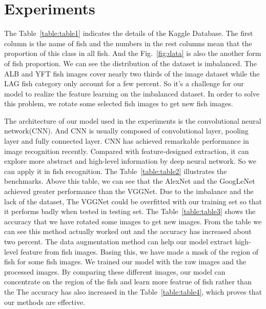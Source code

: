 \documentclass[conference]{IEEEtran}
\begin{document}




\section{Experiments}
The Table~\ref{table:table1} indicates the details of the Kaggle Database. The first column is the name of fish and the numbers in the rest columns mean that the proportion of this class in all fish. And the Fig.~\ref{fig:data} is also the another form of fish proportion. We can see the distribution of the dataset is imbalanced. The ALB and YFT fish images cover nearly two thirds of the image dataset while the LAG fish category only account for a few percent. So it's a challenge for our model to realize the feature learning on the imbalanced dataset. In order to solve this problem, we rotate some selected fish images to get new fish images.\par

The architecture of our model used in the experiments is the convolutional neural network(CNN). And CNN is usually composed of convolutional layer, pooling layer and fully connected layer. CNN has achieved remarkable performance in image recognition recently. Compared with feature-designed extraction, it can explore more abstract and high-level information by deep neural network. So we can apply it in fish recognition. The Table~\ref{table:table2} illustrates the benchmarks. Above this table, we can see that the AlexNet and the GoogLeNet achieved greater performance than the VGGNet. Due to the imbalance and the lack of the dataset, The VGGNet could be overfitted with our training set so that it performs badly when tested in testing set. The Table~\ref{table:table3} shows the accuracy that we have rotated some images to get new images. From the table we can see this method actually worked out and the accuracy has increased about two percent. The data augmentation method can help our model extract high-level feature from fish images. Basing this, we have made a mask of the region of fish for some fish images. We trained our model with the raw images and the processed images. By comparing these different images, our model can concentrate on the region of the fish and learn more featrue of fish rather than the The accuracy has also increased in the Table~\ref{table:table4}, which proves that our methods are effective. 
\end{document}
